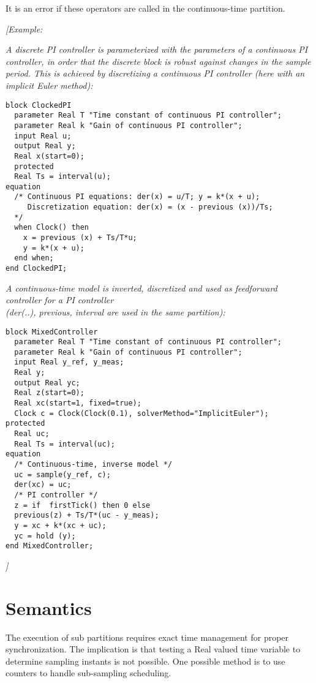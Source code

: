 It is an error if these operators are called in the continuous-time
partition.

\emph{{[}Example:}

\emph{A discrete PI controller is parameterized with the parameters of a
continuous PI controller, in order that the discrete block is robust
against changes in the sample period. This is achieved by discretizing a
continuous PI controller (here with an implicit Euler method):}

\begin{lstlisting}[language=modelica]
block ClockedPI
  parameter Real T "Time constant of continuous PI controller";
  parameter Real k "Gain of continuous PI controller";
  input Real u;
  output Real y;
  Real x(start=0);
  protected
  Real Ts = interval(u);
equation
  /* Continuous PI equations: der(x) = u/T; y = k*(x + u);
     Discretization equation: der(x) = (x - previous (x))/Ts;
  */
  when Clock() then
    x = previous (x) + Ts/T*u;
    y = k*(x + u);
  end when;
end ClockedPI;
\end{lstlisting}
\emph{A continuous-time model is inverted, discretized and used as
feedforward controller for a PI controller\\
(der(..), previous, interval are used in the same partition):}

\begin{lstlisting}[language=modelica]
block MixedController
  parameter Real T "Time constant of continuous PI controller";
  parameter Real k "Gain of continuous PI controller";
  input Real y_ref, y_meas;
  Real y;
  output Real yc;
  Real z(start=0);
  Real xc(start=1, fixed=true);
  Clock c = Clock(Clock(0.1), solverMethod="ImplicitEuler");
protected
  Real uc;
  Real Ts = interval(uc);
equation
  /* Continuous-time, inverse model */
  uc = sample(y_ref, c);
  der(xc) = uc;
  /* PI controller */
  z = if  firstTick() then 0 else
  previous(z) + Ts/T*(uc - y_meas);
  y = xc + k*(xc + uc);
  yc = hold (y);
end MixedController;
\end{lstlisting}
\emph{{]}}

\section{Semantics}

The execution of sub partitions requires exact time management for
proper synchronization. The implication is that testing a Real valued
time variable to determine sampling instants is not possible. One
possible method is to use counters to handle sub-sampling scheduling.

